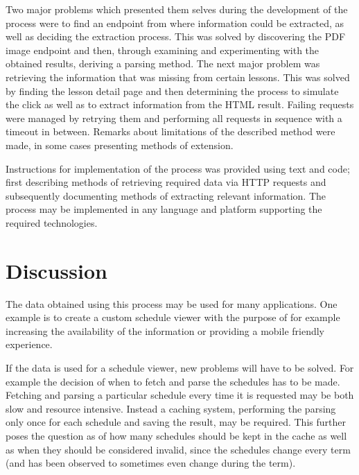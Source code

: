 \documentclass{article}
\begin{document}
	Two major problems which presented them selves during the development of the process were to find an endpoint from where information could be extracted, as well as deciding the extraction process. This was solved by discovering the PDF image endpoint and then, through examining and experimenting with the obtained results, deriving a parsing method. The next major problem was retrieving the information that was missing from certain lessons. This was solved by finding the lesson detail page and then determining the process to simulate the click as well as to extract information from the HTML result. Failing requests were managed by retrying them and performing all requests in sequence with a timeout in between. Remarks about limitations of the described method were made, in some cases presenting methods of extension.
	
	Instructions for implementation of the process was provided using text and code; first describing methods of retrieving required data via HTTP requests and subsequently documenting methods of extracting relevant information. The process may be implemented in any language and platform supporting the required technologies.
	
	\section{Discussion}
	The data obtained using this process may be used for many applications. One example is to create a custom schedule viewer with the purpose of for example increasing the availability of the information or providing a mobile friendly experience.

	If the data is used for a schedule viewer, new problems will have to be solved. For example the decision of when to fetch and parse the schedules has to be made. Fetching and parsing a particular schedule every time it is requested may be both slow and resource intensive. Instead a caching system, performing the parsing only once for each schedule and saving the result, may be required. This further poses the question as of how many schedules should be kept in the cache as well as when they should be considered invalid, since the schedules change every term (and has been observed to sometimes even change during the term).
	
\end{document}
